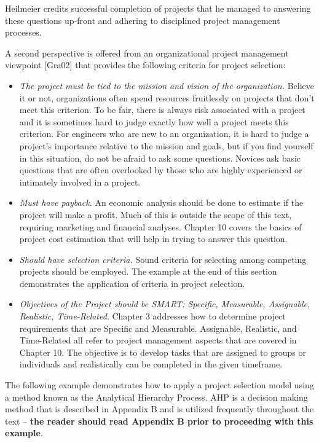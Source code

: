Heilmeier credits successful completion of projects that he managed to
answering these questions up-front and adhering to disciplined project
management processes.

A second perspective is offered from an organizational project
management viewpoint {[}Gra02{]} that provides the following criteria
for project selection:

\begin{itemize}
\item
  \emph{The project must be tied to the mission and vision of the
  organization.} Believe it or not, organizations often spend resources
  fruitlessly on projects that don't meet this criterion. To be fair,
  there is always risk associated with a project and it is sometimes
  hard to judge exactly how well a project meets this criterion. For
  engineers who are new to an organization, it is hard to judge a
  project's importance relative to the mission and goals, but if you
  find yourself in this situation, do not be afraid to ask some
  questions. Novices ask basic questions that are often overlooked by
  those who are highly experienced or intimately involved in a project.
\item
  \emph{Must have payback.} An economic analysis should be done to
  estimate if the project will make a profit. Much of this is outside
  the scope of this text, requiring marketing and financial analyses.
  Chapter 10 covers the basics of project cost estimation that will help
  in trying to answer this question.
\item
  \emph{Should have selection criteria.} Sound criteria for selecting
  among competing projects should be employed. The example at the end of
  this section demonstrates the application of criteria in project
  selection.
\end{itemize}

\begin{itemize}
\item
  \emph{\hfill\break
  Objectives of the Project should be SMART: Specific, Measurable,
  Assignable, Realistic, Time-Related}. Chapter 3 addresses how to
  determine project requirements that are Specific and Measurable.
  Assignable, Realistic, and Time-Related all refer to project
  management aspects that are covered in Chapter 10. The objective is to
  develop tasks that are assigned to groups or individuals and
  realistically can be completed in the given timeframe.
\end{itemize}

The following example demonstrates how to apply a project selection
model using a method known as the Analytical Hierarchy Process. AHP is a
decision making method that is described in Appendix B and is utilized
frequently throughout the text -- \textbf{the reader should read
Appendix B prior to proceeding with this example}.

